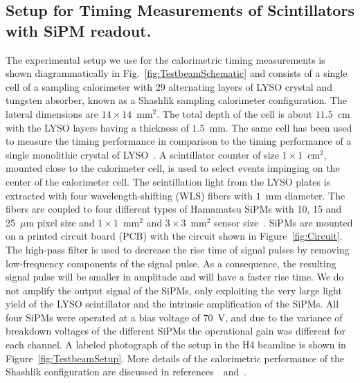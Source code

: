 \subsection{Setup for Timing Measurements of Scintillators with SiPM readout.}
\label{sec:LYSOSiPMSetup}
The experimental setup we use for the calorimetric timing measurements 
is shown diagrammatically in Fig.~\ref{fig:TestbeamSchematic} and consists
of a single cell of a sampling calorimeter with 29 alternating layers of LYSO
crystal and tungsten absorber, known as a Shashlik sampling
calorimeter configuration. The lateral dimensions are
$14\times14$~$\mathrm{mm}^{2}$. The total depth of the cell is about $11.5$~cm
with the LYSO layers having a thickness of $1.5$~mm. The same cell has been used
to measure the timing performance in comparison to the timing performance of a
single monolithic crystal of LYSO~\cite{Anderson:2015gha}. A scintillator
counter of size $1\times 1$~$\mathrm{cm}^{2}$, mounted close to the calorimeter
cell, is used to select events impinging on the center of the calorimeter cell. The
scintillation light from the LYSO plates is extracted with four
wavelength-shifting (WLS) fibers with $1$~mm diameter. The fibers are coupled to four different types
of Hamamatsu SiPMs with 10, 15 and 25~$\mu$m pixel size and $1\times
1$~$\mathrm{mm}^{2}$ and $3\times 3$~$\mathrm{mm}^{2}$ sensor
size~\cite{hamamatsuMPPC}. SiPMs are mounted on a printed circuit board (PCB) with the 
circuit shown in Figure~\ref{fig:Circuit}. The high-pass filter is used to decrease the rise time of signal 
pulses by removing low-frequency components of the signal pulse. As a consequence, the resulting 
signal pulse will be smaller in amplitude and will have a faster rise time.
We do not amplify the output signal of the SiPMs, only exploiting the very large
light yield of the LYSO scintillator and the intrinsic amplification of the
SiPMs. All four SiPMs were operated at a bias voltage of $70$~V, and due to the 
variance of breakdown voltages of the different SiPMs the operational gain was 
different for each channel. A labeled photograph of the setup in the H4 beamline is shown in
Figure~\ref{fig:TestbeamSetup}. More details of the calorimetric
performance of the Shashlik configuration are discussed in
references~\cite{shashlik1}~and~\cite{shashlik2}.

